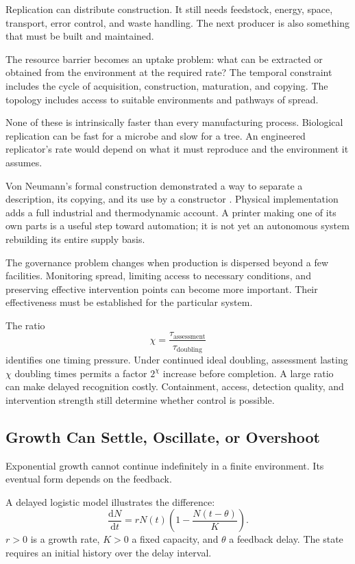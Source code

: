 \documentclass[11pt,openany]{book}
\begin{document}
Replication can distribute construction. It still needs feedstock, energy, space, transport, error control, and waste handling. The next producer is also something that must be built and maintained.

The resource barrier becomes an uptake problem: what can be extracted or obtained from the environment at the required rate? The temporal constraint includes the cycle of acquisition, construction, maturation, and copying. The topology includes access to suitable environments and pathways of spread.

None of these is intrinsically faster than every manufacturing process. Biological replication can be fast for a microbe and slow for a tree. An engineered replicator's rate would depend on what it must reproduce and the environment it assumes.

Von Neumann's formal construction demonstrated a way to separate a description, its copying, and its use by a constructor \cite{vonneumann1966theory}. Physical implementation adds a full industrial and thermodynamic account. A printer making one of its own parts is a useful step toward automation; it is not yet an autonomous system rebuilding its entire supply basis.

The governance problem changes when production is dispersed beyond a few facilities. Monitoring spread, limiting access to necessary conditions, and preserving effective intervention points can become more important. Their effectiveness must be established for the particular system.

The ratio
\begin{equation}
 \chi=\frac{\tau_{\mathrm{assessment}}}
            {\tau_{\mathrm{doubling}}}
\end{equation}
identifies one timing pressure. Under continued ideal doubling, assessment lasting $\chi$ doubling times permits a factor $2^\chi$ increase before completion. A large ratio can make delayed recognition costly. Containment, access, detection quality, and intervention strength still determine whether control is possible.

\subsection{Growth Can Settle, Oscillate, or Overshoot}

Exponential growth cannot continue indefinitely in a finite environment. Its eventual form depends on the feedback.

A delayed logistic model illustrates the difference:
\begin{equation}
 \frac{\mathrm dN}{\mathrm dt}
 =rN(t)\left(1-\frac{N(t-\theta)}{K}\right).
\end{equation}
$r>0$ is a growth rate, $K>0$ a fixed capacity, and $\theta$ a feedback delay. The state requires an initial history over the delay interval.
\end{document}
